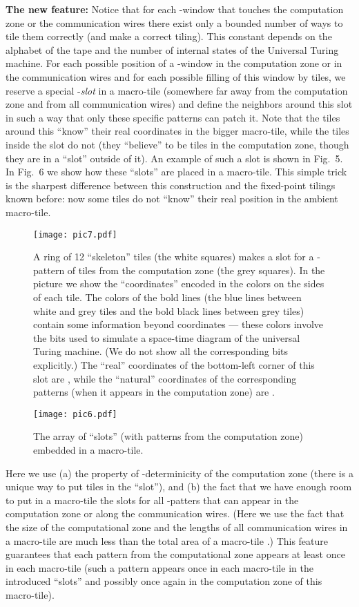 \documentclass[runningheads]{llncs}
\begin{document}
\textbf{The new feature:} Notice that for each -window that touches the computation zone or the communication wires there exist only a bounded number  of ways to tile them correctly (and make a correct tiling). This constant   depends on the alphabet of the tape and the number of internal states of the Universal Turing machine. For each possible position of a -window in the computation zone or in the communication wires and for each possible filling of this window by tiles, we reserve a special -\emph{slot} in a macro-tile (somewhere far away from the computation zone and from all communication wires) and define the neighbors around this slot in such a way that only these specific  patterns can patch it.  Note that the tiles around this  ``know'' their real coordinates in the bigger macro-tile, while the tiles inside the slot do not (they ``believe'' to be tiles in the computation zone, though they are in a ``slot'' outside of it). An example of such a slot is shown in Fig.~5. In Fig.~6 we show how these ``slots'' are placed in a macro-tile. This simple trick is the sharpest difference between this construction and the fixed-point tilings known before: now some tiles do  not ``know'' their real position in the ambient macro-tile.  
\begin{figure}
\centering
\texttt{[image: pic7.pdf]}
\label{pic5}
\caption{A ring of 12 ``skeleton'' tiles (the white squares) makes a slot for a -pattern of tiles from the computation zone (the grey squares). In the picture we show the ``coordinates'' encoded in the colors on the sides of each tile. 
The colors of the bold lines (the blue lines between white and grey tiles and the bold black lines between grey tiles) contain some information beyond coordinates --- these colors involve the bits used to simulate a space-time diagram of the universal Turing machine. (We do not show all the corresponding bits explicitly.) 
The ``real'' coordinates of the bottom-left corner of this slot are , while the ``natural'' coordinates of the corresponding patterns (when it appears in the computation zone) are . 
}
\end{figure}
\begin{figure}
\centering
\texttt{[image: pic6.pdf]}
\label{pic6}
\caption{The array of ``slots'' (with patterns from the computation zone) embedded in a macro-tile.}
\end{figure}

Here we use (a) the property of  -determinicity of the computation zone (there is a unique way to put tiles in the ``slot''), and (b) the fact that we have enough room to put in a macro-tile the slots for all -patters that can appear in the computation zone or along the communication wires. (Here we use the fact that the size of the computational zone  and the lengths of all communication wires  in a macro-tile are much less than the total area of a macro-tile  .) This feature guarantees that each  pattern from the computational zone appears at least once in each macro-tile (such a pattern appears once in each macro-tile  in the introduced ``slots'' and possibly once again in the computation zone of this macro-tile).
\end{document}
